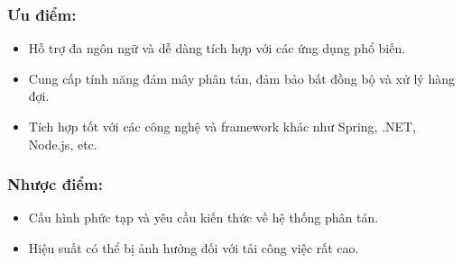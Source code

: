 \subsubsection{Ưu điểm:}
\begin{itemize}
    \item Hỗ trợ đa ngôn ngữ và dễ dàng tích hợp với các ứng dụng phổ biến.
    \item Cung cấp tính năng đám mây phân tán, đảm bảo bất đồng bộ và xử lý hàng đợi.
    \item Tích hợp tốt với các công nghệ và framework khác như Spring, .NET, Node.js, etc.
\end{itemize}
\subsubsection{Nhược điểm:}
\begin{itemize}
    \item Cấu hình phức tạp và yêu cầu kiến thức về hệ thống phân tán.
    \item Hiệu suất có thể bị ảnh hưởng đối với tải công việc rất cao.
\end{itemize}